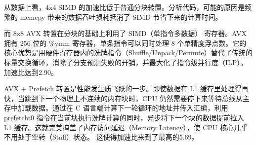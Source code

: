 \documentclass[11pt]{article}
\begin{document}
从数据上看，4x4 SIMD 的加速比低于普通分块转置。分析代码，可能的原因是频繁的 memcpy 带来的数据吞吐损耗抵消了 SIMD 节省下来的计算时间。

而 8x8 AVX 转置在分块的基础上利用了 SIMD（单指令多数据） 寄存器。AVX 拥有 256 位的 \%ymm 寄存器，单条指令可以同时处理 8 个单精度浮点数。它的核心优势是用硬件寄存器内的洗牌指令（Shuffle/Unpack/Permute）替代了传统的标量交换循环，消除了分支预测失败的开销，并最大化了指令级并行度（ILP）。加速比达到2.90。

AVX + Prefetch 转置是性能发生质飞跃的一步。即使数据在 L1 缓存里处理得再快，当跳到下一个物理上不连续的内存块时，CPU 仍然需要停下来等待总线从主存中加载数据。通过在 C 语言端计算下一轮循环的地址并传入汇编，利用 prefetcht0 指令在当前块执行洗牌计算的同时，异步将下一个块的数据提前拉入 L1 缓存。这就完美掩盖了内存访问延迟（Memory Latency），使 CPU 核心几乎不用处于空转（Stall）状态。
这使得加速比来到了最高的5.69。
\end{document}
